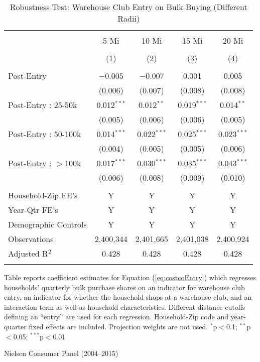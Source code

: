 \begin{table}[!htbp] \centering
  \caption{Robustness Test: Warehouse Club Entry on Bulk Buying (Different Radii)}
  \label{tab:appendixCostcoEntryDifferentRadii}
\begin{tabular}{@{\extracolsep{5pt}}lcccc}
\\[-1.8ex]\hline
\hline \\[-1.8ex]
 & 5 Mi & 10 Mi & 15 Mi & 20 Mi \\
\\[-1.8ex] & (1) & (2) & (3) & (4)\\
\hline \\[-1.8ex]
 Post-Entry & $-$0.005 & $-$0.007 & 0.001 & 0.005 \\
  & (0.006) & (0.007) & (0.008) & (0.008) \\
  Post-Entry : 25-50k & 0.012$^{***}$ & 0.012$^{**}$ & 0.019$^{***}$ & 0.014$^{**}$ \\
  & (0.005) & (0.006) & (0.006) & (0.005) \\
  Post-Entry : 50-100k & 0.014$^{***}$ & 0.022$^{***}$ & 0.025$^{***}$ & 0.023$^{***}$ \\
  & (0.004) & (0.005) & (0.005) & (0.006) \\
  Post-Entry : $>$100k & 0.017$^{***}$ & 0.030$^{***}$ & 0.035$^{***}$ & 0.043$^{***}$ \\
  & (0.006) & (0.008) & (0.009) & (0.010) \\
 \hline \\[-1.8ex]
Household-Zip FE's & Y & Y & Y & Y \\
Year-Qtr FE's & Y & Y & Y & Y \\
Demographic Controls & Y & Y & Y & Y \\
Observations & 2,400,344 & 2,401,665 & 2,401,038 & 2,400,924 \\
Adjusted R$^{2}$ & 0.428 & 0.428 & 0.428 & 0.428 \\
\hline
\hline \\[-1.8ex]
\end{tabular}
\begin{tablenotes}
Table reports coefficient estimates for Equation (\ref{eq:costcoEntry}) which regresses households' quarterly bulk purchase shares on an indicator for warehouse club entry, an indicator for whether the household shops at a warehouse club, and an interaction term as well as household characteristics. Different distance cutoffs defining an ``entry'' are used for each regression. Household-Zip code and year-quarter fixed effects are included. Projection weights are not used. $^{*}$p$<$0.1; $^{**}$p$<$0.05; $^{***}$p$<$0.01
\end{tablenotes}
\begin{tablenotes}[Source]
Nielsen Consumer Panel (2004--2015)
\end{tablenotes}
\end{table}
